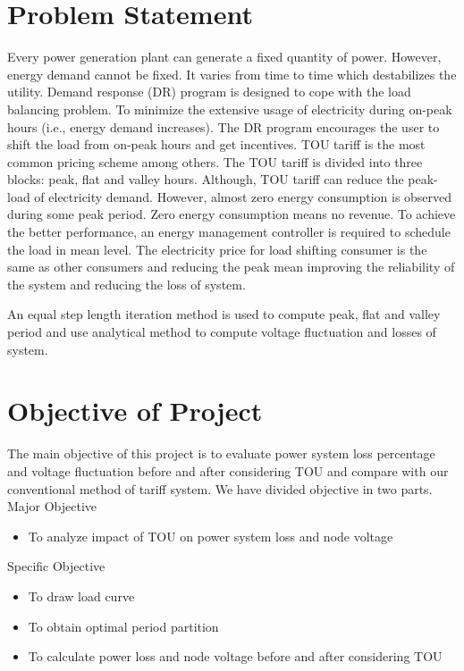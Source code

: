 \documentclass[14 pt]{article}
\begin{document}
\pagebreak
\section{Problem Statement}
Every power generation plant can generate a fixed quantity of power. However,
energy demand cannot be fixed. It varies from time to time which destabilizes the
utility. Demand response (DR) program is designed to cope with the load balancing problem. To minimize the extensive usage of electricity during on-peak hours
(i.e., energy demand increases). The DR program encourages the user to shift
the load from on-peak hours and get incentives. TOU tariff is the most common
pricing scheme among others. The TOU tariff is divided into three blocks: peak,
flat and valley hours. Although, TOU tariff can reduce the peak-load of electricity demand. However, almost zero energy consumption is observed during some
peak period. Zero energy consumption means no revenue. To achieve the better
performance, an energy management controller is required to schedule the load in
mean level. The electricity price for load shifting consumer is the same as other
consumers and reducing the peak mean improving the reliability of the system and
reducing the loss of system.


An equal step length iteration method is used to compute peak, flat and valley
period and use analytical method to compute voltage fluctuation and losses of
system.

\pagebreak
\section{Objective of Project}
The main objective of this project is to evaluate power system loss percentage
and voltage fluctuation before and after considering TOU and compare with our
conventional method of tariff system. We have divided objective in two parts.\\
Major Objective
\begin{itemize}[noitemsep]
\item To analyze impact of TOU on power system loss and node voltage
\end{itemize}
Specific Objective
\begin{itemize}[noitemsep]
\item To draw load curve
\item To obtain optimal period partition
\item To calculate power loss and node voltage before and after considering TOU
\end{itemize}
\end{document}
